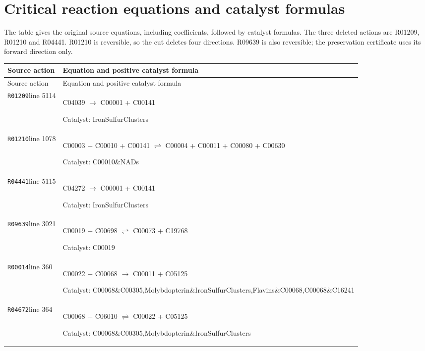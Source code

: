 \documentclass[10pt]{article}
\begin{document}
\section{Critical reaction equations and catalyst formulas}
The table gives the original source equations, including coefficients, followed by catalyst formulas. The three deleted actions are R01209, R01210 and R04441. R01210 is reversible, so the cut deletes four directions. R09639 is also reversible; the preservation certificate uses its forward direction only.
\begin{longtable}{>{\raggedright\arraybackslash}p{.17\linewidth}>{\raggedright\arraybackslash}p{.75\linewidth}}
\toprule Source action & Equation and positive catalyst formula\\\midrule
\endfirsthead\toprule Source action & Equation and positive catalyst formula\\\midrule
\endhead
\texttt{R01209}\newline line 5114 & C04039 $\longrightarrow$ C00001 + C00141\par\smallskip Catalyst: IronSulfurClusters\\
\texttt{R01210}\newline line 1078 & C00003 + C00010 + C00141 $\rightleftharpoons$ C00004 + C00011 + C00080 + C00630\par\smallskip Catalyst: C00010\&\allowbreak NADs\\
\texttt{R04441}\newline line 5115 & C04272 $\longrightarrow$ C00001 + C00141\par\smallskip Catalyst: IronSulfurClusters\\
\texttt{R09639}\newline line 3021 & C00019 + C00698 $\rightleftharpoons$ C00073 + C19768\par\smallskip Catalyst: C00019\\
\texttt{R00014}\newline line 360 & C00022 + C00068 $\longrightarrow$ C00011 + C05125\par\smallskip Catalyst: C00068\&\allowbreak C00305,\allowbreak Molybdopterin\&\allowbreak IronSulfurClusters,\allowbreak Flavins\&\allowbreak C00068,\allowbreak C00068\&\allowbreak C16241\\
\texttt{R04672}\newline line 364 & C00068 + C06010 $\rightleftharpoons$ C00022 + C05125\par\smallskip Catalyst: C00068\&\allowbreak C00305,\allowbreak Molybdopterin\&\allowbreak IronSulfurClusters\\

\end{longtable}
\end{document}
